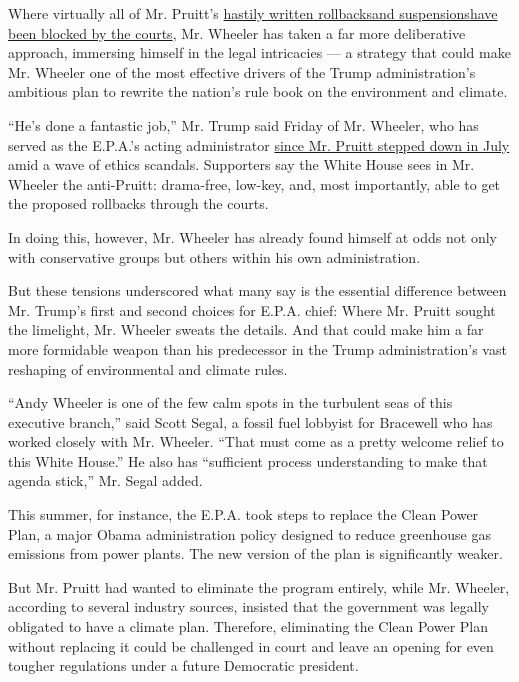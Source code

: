 Where virtually all of Mr. Pruitt's
\href{https://www.nytimes.com/2018/04/07/climate/scott-pruitt-epa-rollbacks.html}{hastily
written
rollbacks}\href{https://www.nytimes.com/2018/04/07/climate/scott-pruitt-epa-rollbacks.html}{and
suspensions}\href{https://www.nytimes.com/2018/04/07/climate/scott-pruitt-epa-rollbacks.html}{have
been blocked by the courts}, Mr. Wheeler has taken a far more
deliberative approach, immersing himself in the legal intricacies --- a
strategy that could make Mr. Wheeler one of the most effective drivers
of the Trump administration's ambitious plan to rewrite the nation's
rule book on the environment and climate.

``He's done a fantastic job,'' Mr. Trump said Friday of Mr. Wheeler, who
has served as the E.P.A.'s acting administrator
\href{https://www.nytimes.com/2018/07/05/climate/scott-pruitt-epa-trump.html}{since
Mr. Pruitt stepped down in July} amid a wave of ethics scandals.
Supporters say the White House sees in Mr. Wheeler the anti-Pruitt:
drama-free, low-key, and, most importantly, able to get the proposed
rollbacks through the courts.

In doing this, however, Mr. Wheeler has already found himself at odds
not only with conservative groups but others within his own
administration.

But these tensions underscored what many say is the essential difference
between Mr. Trump's first and second choices for E.P.A. chief: Where Mr.
Pruitt sought the limelight, Mr. Wheeler sweats the details. And that
could make him a far more formidable weapon than his predecessor in the
Trump administration's vast reshaping of environmental and climate
rules.

``Andy Wheeler is one of the few calm spots in the turbulent seas of
this executive branch,'' said Scott Segal, a fossil fuel lobbyist for
Bracewell who has worked closely with Mr. Wheeler. ``That must come as a
pretty welcome relief to this White House.'' He also has ``sufficient
process understanding to make that agenda stick,'' Mr. Segal added.

This summer, for instance, the E.P.A. took steps to replace the Clean
Power Plan, a major Obama administration policy designed to reduce
greenhouse gas emissions from power plants. The new version of the plan
is significantly weaker.

But Mr. Pruitt had wanted to eliminate the program entirely, while Mr.
Wheeler, according to several industry sources, insisted that the
government was legally obligated to have a climate plan. Therefore,
eliminating the Clean Power Plan without replacing it could be
challenged in court and leave an opening for even tougher regulations
under a future Democratic president.

